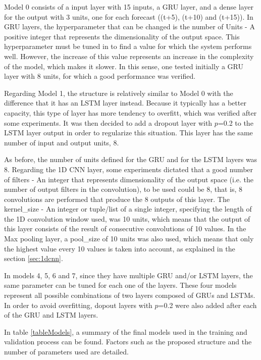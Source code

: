 Model 0 consists of a input layer with 15 inputs, a \ac{GRU} layer, and a dense layer for the output with 3 units, one for each forecast ((t+5), (t+10) and (t+15)). In \ac{GRU} layers, the hyperparameter that can be changed is the number of Units - A positive integer that represents the dimensionality of the output space. This hyperparameter must be tuned in to find a value for which the system performs well. However, the increase of this value represents an increase in the complexity of the model, which makes it slower.  In this sense, one tested initially a \ac{GRU} layer with 8 units, for which a good performance was verified.

Regarding Model 1, the structure is relatively similar to Model 0 with the difference that it has an \ac{LSTM} layer instead. Because it typically has a better capacity, this type of layer has more tendency to overfitt, which was verified after some experiments. It was then decided to add a dropout layer with $p$=0.2 to the \ac{LSTM} layer output in order to regularize this situation. This layer has the same number of input and output units, 8.

As before, the number of units defined for the \ac{GRU} and for the \ac{LSTM} layers was 8. Regarding the \ac{1D CNN} layer, some experiments dictated that a good number of filters - An integer that represents dimensionality of the output space (i.e. the number of output filters in the convolution),  to be used could be 8, that is, 8 convolutions are performed that produce the 8 outputs of this layer. The kernel\_size - An integer or tuple/list of a single integer, specifying the length of the 1D convolution window used, was 10 units, which means that the output of this layer consists of the result of consecutive convolutions of 10 values. In the Max pooling layer, a pool\_size of 10 units was also used, which means that only the highest value every 10 values is taken into account, as explained in the section \ref{sec:1dcnn}.

In models 4, 5, 6 and 7, since they have multiple \ac{GRU} and/or \ac{LSTM} layers, the same parameter can be tuned for each one of the layers. These four models represent all possible combinations of two layers composed of \ac{GRU}s and \ac{LSTM}s. In order to avoid overfitting, dopout layers with $p$=0.2 were also added after each of the \ac{GRU} and \ac{LSTM} layers.

In table \ref{tableModels}, a summary of the final models used in the training and validation process can be found. Factors such as the proposed structure and the number of parameters used are detailed.

